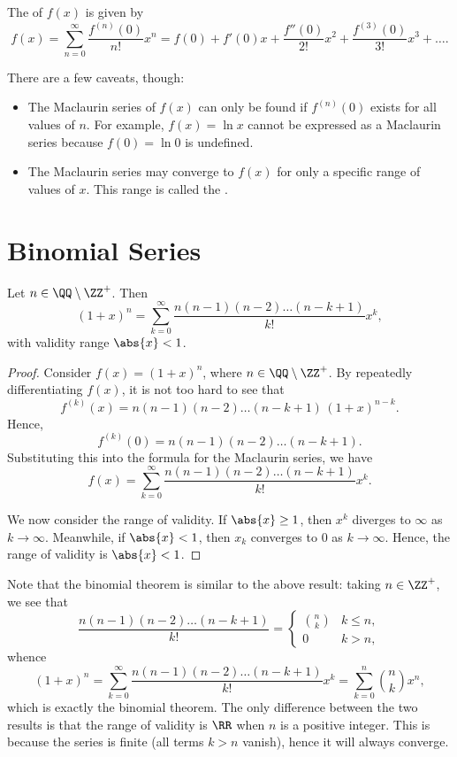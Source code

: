 \begin{definition}
    The  of $f(x)$ is given by \[f(x) = \sum_{n=0}^\infty \frac{f^{(n)}(0)}{n!} x^n = f(0) + f'(0) x + \frac{f''(0)}{2!} x^2 + \frac{f^{(3)}(0)}{3!} x^3 + \dots.\]
\end{definition}

There are a few caveats, though:
\begin{itemize}
    \item The Maclaurin series of $f(x)$ can only be found if $f^{(n)}(0)$ exists for all values of $n$. For example, $f(x) = \ln x$ cannot be expressed as a Maclaurin series because $f(0) = \ln 0$ is undefined.
    \item The Maclaurin series may converge to $f(x)$ for only a specific range of values of $x$. This range is called the .
\end{itemize}

\section{Binomial Series}

\begin{proposition}
    Let $n \in \QQ \setminus \ZZ^+$. Then \[(1+x)^n = \sum_{k = 0}^\infty \frac{n(n-1)(n-2)\dots(n-k+1)}{k!} x^k,\] with validity range $\abs{x} < 1$.
\end{proposition}
\begin{proof}
    Consider $f(x) = (1 + x)^n$, where $n \in \QQ \setminus \ZZ^+$. By repeatedly differentiating $f(x)$, it is not too hard to see that \[f^{(k)}(x) = n(n-1)(n-2)\dots(n-k+1) \, (1 + x)^{n-k}.\] Hence, \[f^{(k)}(0) = n(n-1)(n-2)\dots(n-k+1).\] Substituting this into the formula for the Maclaurin series, we have \[f(x) = \sum_{k = 0}^\infty \frac{n(n-1)(n-2)\dots(n-k+1)}{k!} x^k.\]

    We now consider the range of validity. If $\abs{x} \geq 1$, then $x^k$ diverges to $\infty$ as $k \to \infty$. Meanwhile, if $\abs{x} < 1$, then $x_k$ converges to 0 as $k \to \infty$. Hence, the range of validity is $\abs{x} < 1$.
\end{proof}

Note that the binomial theorem is similar to the above result: taking $n \in \ZZ^+$, we see that \[\frac{n(n-1)(n-2)\dots(n-k+1)}{k!} = \begin{cases}
    \binom{n}{k} & k \leq n,\\
    0 & k > n,
\end{cases}\] whence \[(1+x)^n = \sum_{k = 0}^\infty \frac{n(n-1)(n-2)\dots(n-k+1)}{k!} x^k = \sum_{k = 0}^n \binom{n}{k} x^n,\] which is exactly the binomial theorem. The only difference between the two results is that the range of validity is $\RR$ when $n$ is a positive integer. This is because the series is finite (all terms $k > n$ vanish), hence it will always converge.

